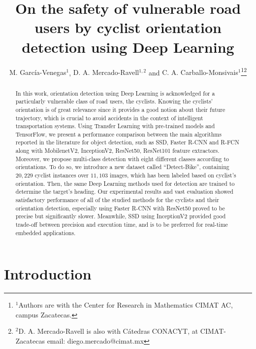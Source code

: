 \documentclass[journal]{IEEEtran}
\begin{document}
\title{On the safety of vulnerable road users by cyclist orientation detection using Deep Learning}

\author{{M. García-Venegas$^{1}$}, {D. A. Mercado-Ravell$^{1,2}$ } and {C. A. Carballo-Monsivais$^1$}\thanks{$^{1}${Authors are with the Center for Research in Mathematics CIMAT AC, campus Zacatecas.}}\thanks{$^{2}${D. A. Mercado-Ravell is also with Cátedras CONACYT, at CIMAT-Zacatecas}
email: {diego.mercado@cimat.mx}}}

\maketitle 

\begin{abstract}
In this work, orientation detection using Deep Learning is acknowledged for a particularly vulnerable class of road users, the cyclists.  Knowing the cyclists' orientation is of great relevance since it provides a good notion about their future trajectory, which is crucial to avoid accidents in the context of intelligent transportation systems. Using Transfer Learning with pre-trained models and TensorFlow, we present a performance comparison between the main algorithms reported in the literature for object detection, such as SSD, Faster R-CNN and R-FCN along with MobilenetV2, InceptionV2, ResNet50, ResNet101 feature extractors. Moreover, we propose multi-class detection with eight different classes according to orientations. To do so, we introduce a new dataset called ``Detect-Bike'', containing $20,229$ cyclist instances over $11,103$ images, which has been labeled based on cyclist's orientation. Then, the same Deep Learning methods used for detection are trained to determine the target's heading. Our experimental results and vast evaluation showed satisfactory performance of all of the studied methods for the cyclists and their orientation detection, especially using Faster R-CNN with ResNet50 proved to be precise but significantly slower. Meanwhile, SSD using InceptionV2 provided good trade-off between precision and execution time, and is to be preferred for real-time embedded applications.
\end{abstract}

\section{Introduction}
\label{sec:Introduction}
\end{document}
